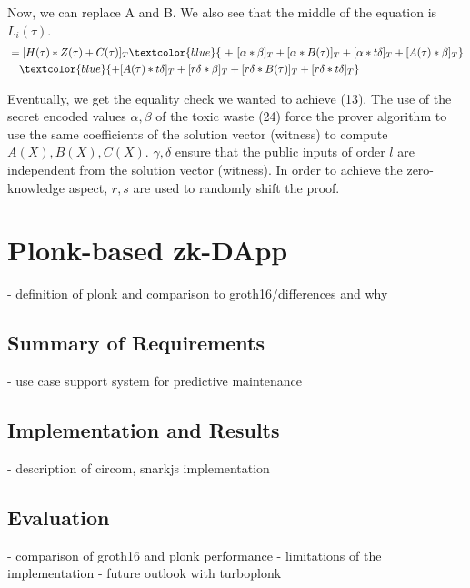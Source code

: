 Now, we can replace A and B. We also see that the middle of the equation is \(L_i(\tau)\).
 \begin{equation*}
     \begin{split}
     &=[H(\tau) * Z(\tau) + C(\tau)]_T \textcolor{blue}{\ +\  [\alpha * \beta]_T + [\alpha * B(\tau)]_T + [\alpha * t\delta]_T + [A(\tau) * \beta]_T} \\
     &\ \ \ \textcolor{blue}{+ [A(\tau) * t\delta]_T + [r\delta * \beta]_T + [r\delta * B(\tau)]_T + [r\delta * t\delta]_T}
     \end{split}
 \end{equation*}

Eventually, we get the equality check we wanted to achieve (13). The use of the secret encoded values \(\alpha, \beta\) of the toxic waste (24) force the prover algorithm to use the same coefficients of the solution vector (witness) to compute \(A(X), B(X), C(X)\). \(\gamma, \delta\) ensure that the public inputs of order \(l\) are independent from the solution vector (witness). In order to achieve the zero-knowledge aspect, \(r, s\) are used to randomly shift the proof.
    


    

\section{Plonk-based zk-DApp}
- definition of plonk and comparison to groth16/differences and why
\subsection{Summary of Requirements}
- use case support system for predictive maintenance
\subsection{Implementation and Results}
- description of circom, snarkjs implementation
\subsection{Evaluation}
- comparison of groth16 and plonk performance
- limitations of the implementation
- future outlook with turboplonk

